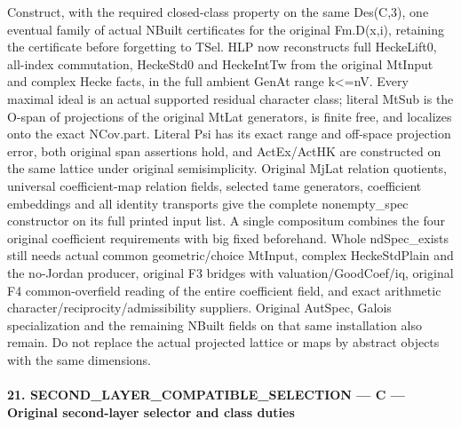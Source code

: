 \documentclass[11pt,a4paper]{article}
\numberwithin{equation}{section}
\theoremstyle{remark}\newtheorem{remark}[theorem]{Remark}
\begin{document}
Construct, with the required closed-class property on the same Des(C,3), one eventual family of actual NBuilt certificates for the original Fm.D(x,i), retaining the certificate before forgetting to TSel. HLP now reconstructs full HeckeLift0, all-index commutation, HeckeStd0 and HeckeIntTw from the original MtInput and complex Hecke facts, in the full ambient GenAt range k<=nV. Every maximal ideal is an actual supported residual character class; literal MtSub is the O-span of projections of the original MtLat generators, is finite free, and localizes onto the exact NCov.part. Literal Psi has its exact range and off-space projection error, both original span assertions hold, and ActEx/ActHK are constructed on the same lattice under original semisimplicity. Original MjLat relation quotients, universal coefficient-map relation fields, selected tame generators, coefficient embeddings and all identity transports give the complete nonempty\_\allowbreak spec constructor on its full printed input list. A single compositum combines the four original coefficient requirements with big fixed beforehand. Whole ndSpec\_\allowbreak exists still needs actual common geometric/choice MtInput, complex HeckeStdPlain and the no-Jordan producer, original F3 bridges with valuation/GoodCoef/iq, original F4 common-overfield reading of the entire coefficient field, and exact arithmetic character/reciprocity/admissibility suppliers. Original AutSpec, Galois specialization and the remaining NBuilt fields on that same installation also remain. Do not replace the actual projected lattice or maps by abstract objects with the same dimensions.



\paragraph{21. SECOND\_\allowbreak LAYER\_\allowbreak COMPATIBLE\_\allowbreak SELECTION — C — Original second-layer selector and class duties}
\end{document}
